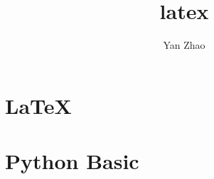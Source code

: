 \documentclass[a4paper,12pt,twoside]{book}
\begin{document}

\title{latex}
\author{Yan Zhao}
\date{}\maketitle

\else
\chapter{\LaTeX}
\fi

	
\chapter{Python Basic}



\ifx \allfiles \undefined

\end{document}
